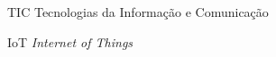 \begin{siglas}
    \item [TIC] Tecnologias da Informação e Comunicação
    \item [IoT] \textit{Internet of Things}
\end{siglas}

